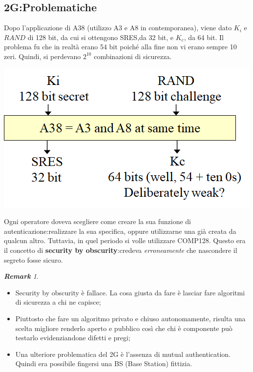\documentclass{book}
\theoremstyle{remark}
\newtheorem*{remark}{\textbf{Remark}}
\begin{document}
\subsection{2G:Problematiche}
Dopo l'applicazione di A38 (utilizzo A3 e A8 in contemporanea), viene dato \(K_i\) e \(RAND\) di 128 bit, da cui si ottengono SRES,da 32 bit, e \(K_c\), da 64 bit\@. Il problema fu che in realtà erano 54 bit poiché alla fine non vi erano sempre 10 zeri\@. Quindi, si perdevano \(2^{10}\) combinazioni di sicurezza\@.
\begin{center}
	\includegraphics[scale=0.4]{A38.png}
\end{center}
Ogni operatore doveva scegliere come creare la sua funzione di autenticazione:\@poteva realizzare la sua specifica, oppure utilizzarne una già creata da qualcun altro\@. Tuttavia, in quel periodo si volle utilizzare COMP128\@. Questo era il concetto di \textbf{security by obscurity}:\@si credeva \emph{erroneamente} che nascondere il segreto fosse sicuro\@.
\begin{remark}
	\begin{itemize}
		\item Security by obscurity è fallace\@. La cosa giusta da fare è lasciar fare algoritmi di sicurezza a chi ne capisce;\@
		\item Piuttosto che fare un algoritmo privato e chiuso autonomamente, risulta una scelta migliore renderlo aperto e pubblico così che chi è componente può testarlo evidenziandone difetti e pregi;\@
		\item Una ulteriore problematica del 2G è l'assenza di mutual authentication\@. Quindi era possibile fingersi una BS (Base Station) fittizia\@.
	\end{itemize}
\end{remark}
\end{document}
